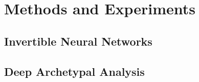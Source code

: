 \chapter{Methods and Experiments}%
\label{cha:methods}

\section{Invertible Neural Networks}

\section{Deep Archetypal Analysis}
